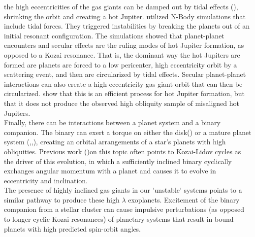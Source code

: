\documentclass{aastex631}
\begin{document}
the high eccentricities of the gas giants can be damped out by tidal effects (\cite{nag08}), shrinking the orbit and creating a hot Jupiter. \cite{bea12} utilized N-Body 
simulations that include tidal forces. They triggered instabilities by breaking the planets out of an initial resonant configuration.
 The simulations showed that planet-planet encounters and secular effects are the ruling modes of hot Jupiter formation, as opposed to a Kozai resonance. That is,
 the dominant way the hot Jupiters are formed are planets are forced to a low pericenter, high eccentricity orbit by a scattering event, and then are circularized
 by tidal effects. Secular planet-planet interactions can also create a high eccentricity gas giant orbit that can then be circularized. \cite{pet15b} show that this is an 
 efficient process for hot Jupiter formation, but that it does not produce the observed high obliquity sample of misaligned hot Jupiters. \\ 
\indent Finally, there can be interactions between a planet system and a binary companion.
The binary can exert a torque on either the disk(\cite{bat12}) or a mature planet system (\cite{fab07},\cite{kai11},\cite{dro20}), creating an 
orbital arrangements of a star's planets with high obliquities. Previous work (\cite{fab07})on this topic often points to Kozai-Lidov cycles as the driver of this evolution, 
in which
a sufficiently inclined binary cyclically exchanges angular momentum with a planet and causes it to evolve in eccentricity and inclination. \\
The presence of highly inclined gas giants in our 'unstable' systems
points to a similar pathway to produce these high $\lambda$ exoplanets. Excitement of the binary companion from a stellar cluster
can cause impulsive perturbations (as opposed to longer cyclic Kozai resonances) of planetary systems that result in bound planets with 
high predicted spin-orbit angles.
\end{document}
